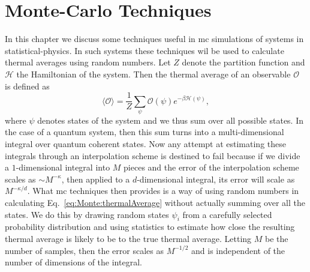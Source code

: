 \chapter{Monte-Carlo Techniques}
\label{chap:Monte}

In this chapter we discuss some techniques useful in \ac{mc} simulations
of systems in statistical-physics.
In such systems these techniques wil be used to calculate thermal averages using random numbers. Let
$Z$ denote the partition function and $\mathcal{H}$ the Hamiltonian of the system. Then the thermal
average of an observable $\mathcal{O}$ is defined as
\begin{equation}
    \label{eq:Monte:thermalAverage}
    \langle\mathcal{O}\rangle = \frac{1}{Z}\sum_\psi\mathcal{O}(\psi)e^{-\beta\mathcal{H}(\psi)},
\end{equation}
where $\psi$ denotes states of the system and we thus sum over all possible states. In the case of
a quantum system, then this sum turns into a multi-dimensional integral over quantum coherent states.
Now any attempt at estimating these integrals through an interpolation scheme is destined to fail because if we divide
a $1$-dimensional integral into $M$ pieces and the error of the interpolation scheme scales as $\sim M^{-\kappa}$,
then applied to a $d$-dimensional integral, its error will scale as $M^{-\kappa/d}$.
What \ac{mc} techniques then provides is a way of using random numbers in calculating
Eq.~\eqref{eq:Monte:thermalAverage} without actually summing over all the states. We do this by drawing random states
$\psi_i$ from a carefully selected probability distribution and using statistics to estimate how close the resulting
thermal average is likely to be to the true thermal average. Letting $M$ be the number of samples, then the
error scales as $M^{-1/2}$ and is independent of the number of dimensions of the integral.

